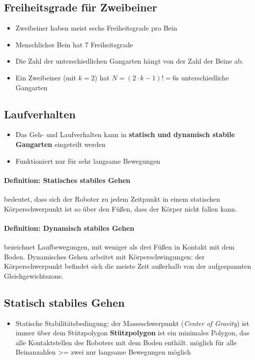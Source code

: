 \subsection{Freiheitsgrade für Zweibeiner}
\begin{itemize}
	\item Zweibeiner haben meist sechs Freiheitsgrade pro Bein
	\item Menschliches Bein hat 7 Freiheitsgrade
	\item Die Zahl der unterschiedlichen Gangarten hängt von der Zahl der Beine ab.
	\item Ein Zweibeiner (mit $k=2$) hat $N = (2 \cdot k - 1)! = 6$s unterschiedliche Gangarten
\end{itemize}
\subsection{Laufverhalten}
\begin{itemize}
	\item Das Geh- und Laufverhalten kann in \textbf{statisch und dynamisch stabile Gangarten} eingeteilt werden
	\item Funktioniert nur für sehr langsame Bewegungen
\end{itemize}
\paragraph{Definition: Statisches stabiles Gehen}
bedeutet, dass sich der Roboter zu jedem Zeitpunkt in einem statischen Körperschwerpunkt ist so über den Füßen, dass der Körper nicht fallen kann.
\paragraph{Definition: Dynamisch stabiles Gehen}
bezeichnet Laufbewegungen, mit weniger als drei Füßen in Kontakt mit dem Boden.
Dynamisches Gehen arbeitet mit Körperschwingungen: der Körperschwerpunkt befindet sich die meiste Zeit außerhalb von der aufgespannten Gleichgewichtszone.
\subsection{Statisch stabiles Gehen}
\begin{itemize}
	\item Statische Stabilitätsbedingung: der Masseschwerpunkt (\textit{Center of Gravity}) ist immer über dem Stützpolygon
	\subitem \textbf{Stützpolygon} ist ein minimales Polygon, das alle Kontaktstellen des Roboters mit dem Boden enthält.
	\subitem möglich für alle Beinanzahlen >= zwei
	\subitem nur langsame Bewegungen möglich
\end{itemize}
